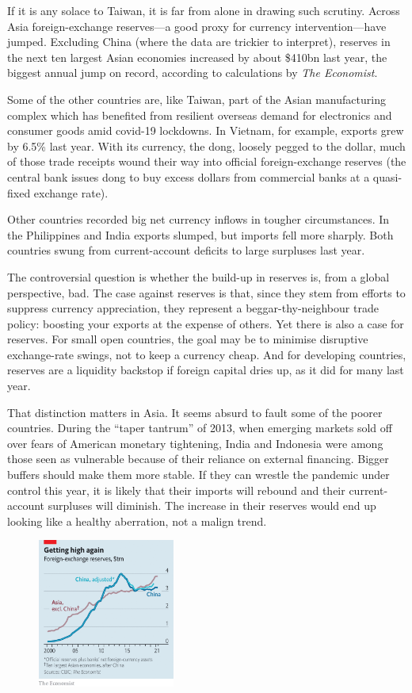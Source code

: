 \documentclass{article}
\begin{document}
If it is any solace to Taiwan, it is far from alone in drawing such scrutiny. Across Asia foreign-exchange reserves---a good proxy for currency intervention---have jumped. Excluding China (where the data are trickier to interpret), reserves in the next ten largest Asian economies increased by about \$410bn last year, the biggest annual jump on record, according to calculations by \emph{The Economist}. 

Some of the other countries are, like Taiwan, part of the Asian manufacturing complex which has benefited from resilient overseas demand for electronics and consumer goods amid covid-19 lockdowns. In Vietnam, for example, exports grew by 6.5\% last year. With its currency, the dong, loosely pegged to the dollar, much of those trade receipts wound their way into official foreign-exchange reserves (the central bank issues dong to buy excess dollars from commercial banks at a quasi-fixed exchange rate). 

Other countries recorded big net currency inflows in tougher circumstances. In the Philippines and India exports slumped, but imports fell more sharply. Both countries swung from current-account deficits to large surpluses last year. 

The controversial question is whether the build-up in reserves is, from a global perspective, bad. The case against reserves is that, since they stem from efforts to suppress currency appreciation, they represent a beggar-thy-neighbour trade policy: boosting your exports at the expense of others. Yet there is also a case for reserves. For small open countries, the goal may be to minimise disruptive exchange-rate swings, not to keep a currency cheap. And for developing countries, reserves are a liquidity backstop if foreign capital dries up, as it did for many last year. 

That distinction matters in Asia. It seems absurd to fault some of the poorer countries. During the ``taper tantrum'' of 2013, when emerging markets sold off over fears of American monetary tightening, India and Indonesia were among those seen as vulnerable because of their reliance on external financing. Bigger buffers should make them more stable. If they can wrestle the pandemic under control this year, it is likely that their imports will rebound and their current-account surpluses will diminish. The increase in their reserves would end up looking like a healthy aberration, not a malign trend. 

\begin{figure}[h]
\centering
\includegraphics[width=0.4\textwidth]{images/20210327_fnc294.png}
\end{figure}
\end{document}
